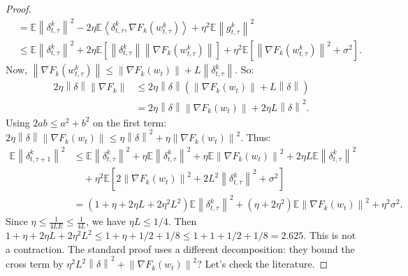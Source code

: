 \documentclass{article}
\newcommand{\norm}[1]{\left\| #1 \right\|}
\newcommand{\inner}[2]{\left\langle #1, #2 \right\rangle}
\begin{document}
\begin{proof}
\begin{align}
&= \mathbb{E}\norm{\delta_{t,\tau}^k}^2 - 2\eta \mathbb{E}\inner{\delta_{t,\tau}^k}{\nabla F_k(w_{t,\tau}^k)} + \eta^2 \mathbb{E}\norm{g_{t,\tau}^k}^2 \\
&\le \mathbb{E}\norm{\delta_{t,\tau}^k}^2 + 2\eta \mathbb{E}\left[ \norm{\delta_{t,\tau}^k} \norm{\nabla F_k(w_{t,\tau}^k)} \right] + \eta^2 \mathbb{E}\left[ \norm{\nabla F_k(w_{t,\tau}^k)}^2 + \sigma^2 \right].
\end{align}
Now, $\norm{\nabla F_k(w_{t,\tau}^k)} \le \norm{\nabla F_k(w_t)} + L \norm{\delta_{t,\tau}^k}$. So:
\begin{align}
2\eta \norm{\delta} \norm{\nabla F_k} &\le 2\eta \norm{\delta} (\norm{\nabla F_k(w_t)} + L \norm{\delta}) \\
&= 2\eta \norm{\delta} \norm{\nabla F_k(w_t)} + 2\eta L \norm{\delta}^2.
\end{align}
Using $2ab \le a^2 + b^2$ on the first term: $2\eta \norm{\delta} \norm{\nabla F_k(w_t)} \le \eta \norm{\delta}^2 + \eta \norm{\nabla F_k(w_t)}^2$.
Thus:
\begin{align}
\mathbb{E}\norm{\delta_{t,\tau+1}^k}^2
&\le \mathbb{E}\norm{\delta_{t,\tau}^k}^2 + \eta \mathbb{E}\norm{\delta_{t,\tau}^k}^2 + \eta \mathbb{E}\norm{\nabla F_k(w_t)}^2 + 2\eta L \mathbb{E}\norm{\delta_{t,\tau}^k}^2 \\
&\quad + \eta^2 \mathbb{E}\left[ 2\norm{\nabla F_k(w_t)}^2 + 2L^2 \norm{\delta_{t,\tau}^k}^2 + \sigma^2 \right] \\
&= (1 + \eta + 2\eta L + 2\eta^2 L^2) \mathbb{E}\norm{\delta_{t,\tau}^k}^2 + (\eta + 2\eta^2) \mathbb{E}\norm{\nabla F_k(w_t)}^2 + \eta^2 \sigma^2.
\end{align}
Since $\eta \le \frac{1}{4LE} \le \frac{1}{4L}$, we have $\eta L \le 1/4$. Then $1 + \eta + 2\eta L + 2\eta^2 L^2 \le 1 + \eta + 1/2 + 1/8 \le 1 + 1 + 1/2 + 1/8 = 2.625$. This is not a contraction. The standard proof uses a different decomposition: they bound the cross term by $\eta^2 L^2 \norm{\delta}^2 + \norm{\nabla F_k(w_t)}^2$? Let's check the literature.


\end{proof}
\end{document}
